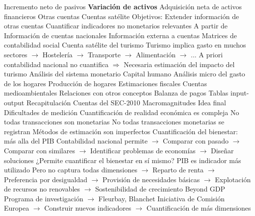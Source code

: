 \documentclass{nuevotema}
\begin{document}
\begin{esquemal}
				\4[] Incremento neto de pasivos
				\4 \textbf{Variación de activos}
				\4[] Adquisición neta de activos financieros
		\2 Otras cuentas
			\3 Cuentas satélite
				\4 Objetivos:
				\4[] Extender información de otras cuentas
				\4[] Cuantificar indicadores no monetarios relevantes
				\4 A partir de
				\4[] Información de cuentas nacionales
				\4[] Información externa a cuentas
				\4 Matrices de contabilidad social
				\4 Cuenta satélite del turismo
				\4[] Turismo implica gasto en muchos sectores
				\4[] $\to$ Hostelería
				\4[] $\to$ Transporte
				\4[] $\to$ Alimentación
				\4[] $\to$ ...
				\4[] A priori contabilidad nacional no cuantifica
				\4[] $\Rightarrow$ Necesaria estimación del impacto del turismo
				\4 Análisis del sistema monetario
				\4 Capital humano
				\4 Análisis micro del gasto de los hogares
				\4 Producción de hogares
				\4 Estimaciones fiscales
				\4 Cuentas medioambientales
		\2 Relaciones con otros conceptos
			\3 Balanza de pagos
			\3 Tablas input-output
	\1[] 
		\2 Recapitulación
			\3 Cuentas del SEC-2010
			\3 Macromagnitudes
		\2 Idea final
			\3 Dificultades de medición
				\4 Cuantificación de realidad económica es compleja
				\4[] No todas transacciones son monetarias
				\4[] No todas transacciones monetarias se registran
				\4[] Métodos de estimación son imperfectos
			\3 Cuantificación del bienestar: más alla del PIB
				\4 Contabilidad nacional permite
				\4[] $\to$ Comparar con pasado
				\4[] $\to$ Comparar con similares
				\4[] $\to$ Identificar problemas de economías
				\4[] $\to$ Diseñar soluciones
				\4 ¿Permite cuantificar el bienestar en sí mismo?
				\4[] PIB es indicador más utilizado
				\4[] Pero no captura todas dimensiones
				\4[] $\to$ Reparto de renta
				\4[] $\to$ Preferencia por desigualdad
				\4[] $\to$ Provisión de necesidades básicas
				\4[] $\to$ Explotación de recursos no renovables
				\4[] $\to$ Sostenibilidad de crecimiento
				\4 Beyond GDP
				\4[] Programa de investigación
				\4[] $\to$ Fleurbay, Blanchet
				\4[] Iniciativa de Comisión Europea
				\4[] $\to$ Construir nuevos indicadores
				\4[] $\to$ Cuantificación de más dimensiones
\end{esquemal}
\end{document}
